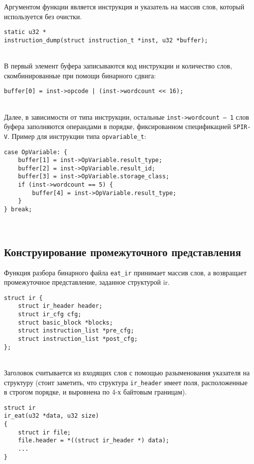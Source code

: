 \documentclass[14pt]{extarticle}
\begin{document}
Аргументом функции является инструкция и указатель на массив слов, который используется без очистки.
\begin{lstlisting}[caption={прототип функции сериализации инструкции}]
static u32 *
instruction_dump(struct instruction_t *inst, u32 *buffer);
\end{lstlisting}
~\\ %

В первый элемент буфера записываются код инструкции и количество слов, скомбинированные при помощи бинарного сдвига:
\begin{lstlisting}[caption={сериализация общей части инструкции}]
buffer[0] = inst->opcode | (inst->wordcount << 16);
\end{lstlisting}
~\\ %

Далее, в зависимости от типа инструкции, остальные \texttt{inst->wordcount – 1} слов буфера заполняются операндами в порядке, фиксированном спецификацией \texttt{SPIR-V}. Пример для инструкции типа \texttt{opvariable\_t}:
\begin{lstlisting}[caption={пример сериализации вариативной части инструкции}]
case OpVariable: {
    buffer[1] = inst->OpVariable.result_type;
    buffer[2] = inst->OpVariable.result_id;
    buffer[3] = inst->OpVariable.storage_class;
    if (inst->wordcount == 5) {
        buffer[4] = inst->OpVariable.result_type;
    }
} break;
\end{lstlisting}
~\\ %

\subsection{Конструирование промежуточного представления}
Функция разбора бинарного файла \texttt{eat\_ir} принимает массив слов, а возвращает промежуточное представление, заданное структурой ir.
\begin{lstlisting}[caption={структура промежуточного представления}]
struct ir {
    struct ir_header header;
    struct ir_cfg cfg;
    struct basic_block *blocks;
    struct instruction_list *pre_cfg;
    struct instruction_list *post_cfg;
};

\end{lstlisting}
~\\ %

Заголовок считывается из входящих слов с помощью разыменования указателя на структуру (стоит заметить, что структура \texttt{ir\_header} имеет поля, расположенные в строгом порядке, и выровнена по 4-х байтовым границам).
\begin{lstlisting}[caption={функция конструирования промежуточного представления}]
struct ir
ir_eat(u32 *data, u32 size)
{
    struct ir file;
    file.header = *((struct ir_header *) data);
    ...
}
\end{lstlisting}
~\\ %
\end{document}
